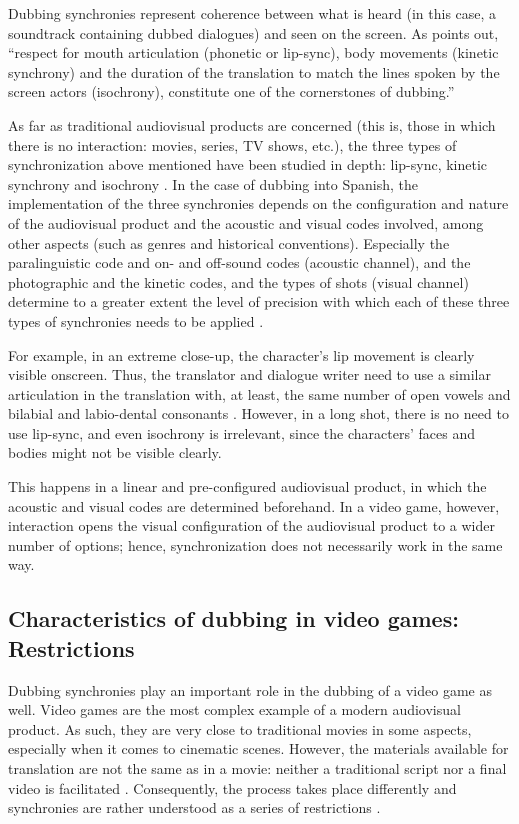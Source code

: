 \documentclass[output=paper]{langsci/langscibook}
\begin{document}
Dubbing synchronies represent coherence between what is heard (in this case, a soundtrack containing dubbed dialogues) and seen on the screen. As \textcite[73]{chaume07} points out, \enquote{respect for mouth articulation (phonetic or lip-sync), body movements (kinetic synchrony) and the duration of the translation to match the lines spoken by the screen actors (isochrony), constitute one of the cornerstones of dubbing.}

As far as traditional audiovisual products are concerned (this is, those in which there is no interaction: movies, series, TV shows, etc.), the three types of synchronization above mentioned have been studied in depth: lip-sync, kinetic synchrony and isochrony \parencite[68]{chaume12}. In the case of dubbing into Spanish, the implementation of the three synchronies depends on the configuration and nature of the audiovisual product and the acoustic and visual codes involved, among other aspects (such as genres and historical conventions). Especially the paralinguistic code and on- and off-sound codes (acoustic channel), and the photographic and the kinetic codes, and the types of shots (visual channel) determine to a greater extent the level of precision with which each of these three types of synchronies needs to be applied \parencite{chaume04}.

For example, in an extreme close-up, the character’s lip movement is clearly visible onscreen. Thus, the translator and dialogue writer need to use a similar articulation in the translation with, at least, the same number of open vowels and bilabial and labio-dental consonants \parencite[73]{chaume12}. However, in a long shot, there is no need to use lip-sync, and even isochrony is irrelevant, since the characters’ faces and bodies might not be visible clearly.

This happens in a linear and pre-configured audiovisual product, in which the acoustic and visual codes are determined beforehand. In a video game, however, interaction opens the visual configuration of the audiovisual product to a wider number of options; hence, synchronization does not necessarily work in the same way.

\subsection{Characteristics of dubbing in video games: Restrictions}

Dubbing synchronies play an important role in the dubbing of a video game as well. Video games are the most complex example of a modern audiovisual product. As such, they are very close to traditional movies in some aspects, especially when it comes to cinematic scenes. However, the materials available for translation are not the same as in a movie: neither a traditional script nor a final video is facilitated \parencite{mejias19}. Consequently, the process takes place differently and synchronies are rather understood as a series of restrictions \parencite[197]{pujol15}.
\end{document}
